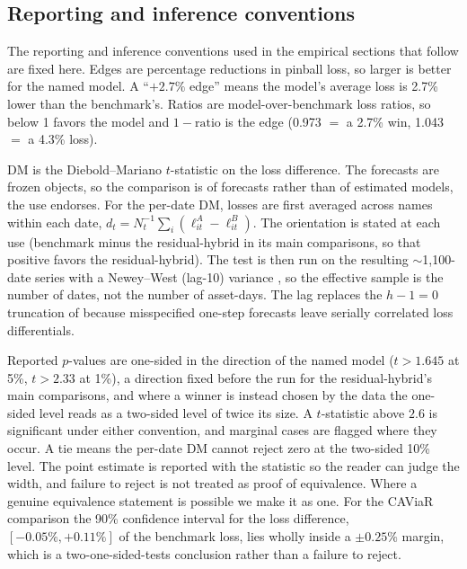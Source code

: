 \documentclass[11pt]{article}
\theoremstyle{remark}
\begin{document}
\subsection{Reporting and inference conventions}
The reporting and inference conventions used in the empirical sections that follow are fixed here. Edges are percentage
reductions in pinball loss, so larger is better for the named
model. A ``$+2.7\%$ edge'' means the model's average loss is 2.7\%
lower than the benchmark's. Ratios are model-over-benchmark
loss ratios, so below 1 favors the model and $1-\text{ratio}$ is
the edge (0.973 $=$ a 2.7\% win, 1.043 $=$ a 4.3\% loss).

DM is the Diebold--Mariano $t$-statistic on the loss
difference. The forecasts are frozen objects, so the comparison is of forecasts rather than of estimated models, the use \citet{diebold2015} endorses. For the per-date DM, losses are first averaged across names within each date, $d_t = N_t^{-1}\sum_i (\ell^{A}_{it} - \ell^{B}_{it})$. The orientation is stated at each use (benchmark minus the residual-hybrid in its main comparisons, so that positive favors the residual-hybrid). The test is then run on the resulting $\sim$1{,}100-date series with a Newey--West (lag-10) variance \citep{neweywest1987}, so the effective sample is the number of dates, not the number of asset-days. The lag replaces the $h-1=0$ truncation of \citet{dieboldmariano1995} because misspecified one-step forecasts leave serially correlated loss differentials.

Reported $p$-values are one-sided in
the direction of the named model ($t>1.645$ at 5\%, $t>2.33$ at 1\%), a direction fixed before the run for the residual-hybrid's main comparisons, and where a winner is instead chosen by the data the one-sided level reads as a two-sided level of twice its size.
A $t$-statistic above $2.6$ is significant under either convention, and
marginal cases are flagged where they occur. A tie means the
per-date DM cannot reject zero at the two-sided 10\% level. The point
estimate is reported with the statistic so the reader can judge the
width, and failure to reject is not treated as proof of equivalence.
Where a genuine equivalence statement is possible we make it as one. For the CAViaR comparison the 90\% confidence interval for the loss difference, $[-0.05\%,+0.11\%]$ of the benchmark loss, lies wholly inside a $\pm0.25\%$ margin, which is a two-one-sided-tests conclusion rather than a failure to reject.
\end{document}
